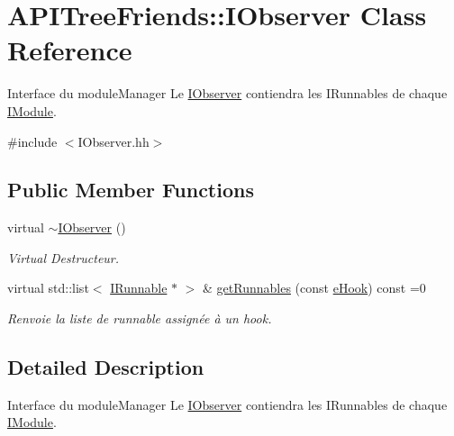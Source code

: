 \hypertarget{class_a_p_i_tree_friends_1_1_i_observer}{}\section{A\+P\+I\+Tree\+Friends\+:\+:I\+Observer Class Reference}
\label{class_a_p_i_tree_friends_1_1_i_observer}


Interface du module\+Manager Le \hyperlink{class_a_p_i_tree_friends_1_1_i_observer}{I\+Observer} contiendra les I\+Runnables de chaque \hyperlink{class_a_p_i_tree_friends_1_1_i_module}{I\+Module}.  




{\ttfamily \#include $<$I\+Observer.\+hh$>$}

\subsection*{Public Member Functions}
\begin{DoxyCompactItemize}
\item 
\hypertarget{class_a_p_i_tree_friends_1_1_i_observer_a7d54be37ac72e6d2dc8b8f1b1c62a5d2}{}virtual \hyperlink{class_a_p_i_tree_friends_1_1_i_observer_a7d54be37ac72e6d2dc8b8f1b1c62a5d2}{$\sim$\+I\+Observer} ()\label{class_a_p_i_tree_friends_1_1_i_observer_a7d54be37ac72e6d2dc8b8f1b1c62a5d2}

\begin{DoxyCompactList}\small\item\em Virtual Destructeur. \end{DoxyCompactList}\item 
virtual std\+::list$<$ \hyperlink{class_a_p_i_tree_friends_1_1_i_runnable}{I\+Runnable} $\ast$ $>$ \& \hyperlink{class_a_p_i_tree_friends_1_1_i_observer_a1042e5c00cf8451611b01d6b60a80d7d}{get\+Runnables} (const \hyperlink{namespace_a_p_i_tree_friends_a3943902c0fe96b820b0261e510dcb720}{e\+Hook}) const =0
\begin{DoxyCompactList}\small\item\em Renvoie la liste de runnable assignée à un hook. \end{DoxyCompactList}\end{DoxyCompactItemize}


\subsection{Detailed Description}
Interface du module\+Manager Le \hyperlink{class_a_p_i_tree_friends_1_1_i_observer}{I\+Observer} contiendra les I\+Runnables de chaque \hyperlink{class_a_p_i_tree_friends_1_1_i_module}{I\+Module}. 


